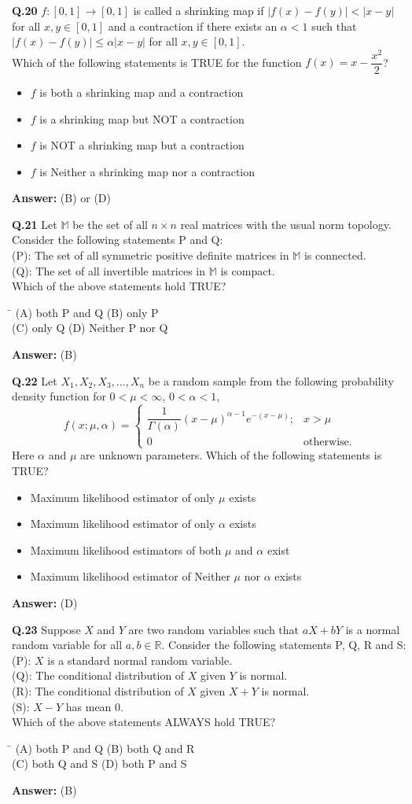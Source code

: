 \documentclass[11pt,a4paper]{article}
\newcommand{\optsfourA}[4]{%
  \begin{tabbing}
    \hspace{0.48\linewidth}\=\kill
    (A) #1 \> (B) #2 \\[2pt]
    (C) #3 \> (D) #4
  \end{tabbing}%
}
\newcommand{\optslistA}[4]{%
  \begin{itemize}
    \setlength{\itemsep}{2pt}\setlength{\parskip}{0pt}
    \item[(A)] #1
    \item[(B)] #2
    \item[(C)] #3
    \item[(D)] #4
  \end{itemize}%
}
\newcommand{\ans}[1]{\textbf{Answer:} #1\par\medskip}
\begin{document}
\textbf{Q.20} $f : [0, 1] \to [0, 1]$ is called a shrinking map if $|f(x) - f(y)| < |x - y|$ for all $x, y \in [0, 1]$ and a contraction if there exists an $\alpha < 1$ such that $|f(x) - f(y)| \le \alpha |x - y|$ for all $x, y \in [0, 1]$.\\
Which of the following statements is TRUE for the function $f(x) = x - \dfrac{x^2}{2}$?
\optslistA{$f$ is both a shrinking map and a contraction}{$f$ is a shrinking map but NOT a contraction}{$f$ is NOT a shrinking map but a contraction}{$f$ is Neither a shrinking map nor a contraction}
\ans{(B) or (D)}

\textbf{Q.21} Let $\mathbb{M}$ be the set of all $n \times n$ real matrices with the usual norm topology. Consider the following statements P and Q:\\
(P): The set of all symmetric positive definite matrices in $\mathbb{M}$ is connected.\\
(Q): The set of all invertible matrices in $\mathbb{M}$ is compact.\\
Which of the above statements hold TRUE?
\optsfourA{both P and Q}{only P}{only Q}{Neither P nor Q}
\ans{(B)}

\textbf{Q.22} Let $X_1, X_2, X_3, \dots, X_n$ be a random sample from the following probability density function for $0 < \mu < \infty$, $0 < \alpha < 1$,
\[
  f(x; \mu, \alpha) = \begin{cases}
    \dfrac{1}{\Gamma(\alpha)} (x - \mu)^{\alpha - 1} e^{-(x - \mu)}; & x > \mu \\[6pt]
    0 & \text{otherwise.}
  \end{cases}
\]
Here $\alpha$ and $\mu$ are unknown parameters. Which of the following statements is TRUE?
\optslistA{Maximum likelihood estimator of only $\mu$ exists}{Maximum likelihood estimator of only $\alpha$ exists}{Maximum likelihood estimators of both $\mu$ and $\alpha$ exist}{Maximum likelihood estimator of Neither $\mu$ nor $\alpha$ exists}
\ans{(D)}

\textbf{Q.23} Suppose $X$ and $Y$ are two random variables such that $aX + bY$ is a normal random variable for all $a, b \in \mathbb{R}$. Consider the following statements P, Q, R and S:\\
(P): $X$ is a standard normal random variable.\\
(Q): The conditional distribution of $X$ given $Y$ is normal.\\
(R): The conditional distribution of $X$ given $X + Y$ is normal.\\
(S): $X - Y$ has mean $0$.\\
Which of the above statements ALWAYS hold TRUE?
\optsfourA{both P and Q}{both Q and R}{both Q and S}{both P and S}
\ans{(B)}
\end{document}
